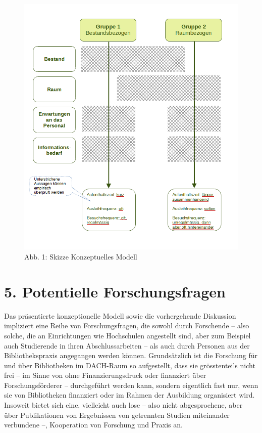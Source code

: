 \documentclass[a4paper,
fontsize=11pt,
oneside,
numbers=noperiodatend,
parskip=half-,
bibliography=totoc,
final
]{scrartcl}
\begin{document}
\begin{figure}
\centering
\includegraphics{img/Skizze_Modell.png}
\caption{Abb. 1: Skizze Konzeptuelles Modell}
\end{figure}

\hypertarget{potentielle-forschungsfragen}{%
\section{5. Potentielle
Forschungsfragen}\label{potentielle-forschungsfragen}}

Das präsentierte konzeptionelle Modell sowie die vorhergehende
Diskussion impliziert eine Reihe von Forschungsfragen, die sowohl durch
Forschende -- also solche, die an Einrichtungen wie Hochschulen
angestellt sind, aber zum Beispiel auch Studierende in ihren
Abschlussarbeiten -- als auch durch Personen aus der Bibliothekspraxis
angegangen werden können. Grundsätzlich ist die Forschung für und über
Bibliotheken im DACH-Raum so aufgestellt, dass sie grösstenteils nicht
frei -- im Sinne von ohne Finanzierungsdruck oder finanziert über
Forschungsförderer -- durchgeführt werden kann, sondern eigentlich fast
nur, wenn sie von Bibliotheken finanziert oder im Rahmen der Ausbildung
organisiert wird. Insoweit bietet sich eine, vielleicht auch lose --
also nicht abgesprochene, aber über Publikationen von Ergebnissen von
getrennten Studien miteinander verbundene --, Kooperation von Forschung
und Praxis an.
\end{document}

